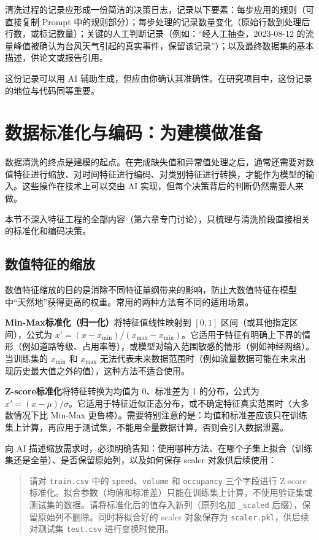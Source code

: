 清洗过程的记录应形成一份简洁的决策日志，记录以下要素：每步应用的规则（可直接复制 Prompt 中的规则部分）；每步处理的记录数量变化（原始行数到处理后行数，或标记数量）；关键的人工判断记录（例如：“经人工抽查，2023-08-12 的流量峰值被确认为台风天气引起的真实事件，保留该记录”）；以及最终数据集的基本描述，供论文或报告引用。

这份记录可以用 AI 辅助生成，但应由你确认其准确性。在研究项目中，这份记录的地位与代码同等重要。

\section{数据标准化与编码：为建模做准备}

数据清洗的终点是建模的起点。在完成缺失值和异常值处理之后，通常还需要对数值特征进行缩放、对时间特征进行编码、对类别特征进行转换，才能作为模型的输入。这些操作在技术上可以交由 AI 实现，但每个决策背后的判断仍然需要人来做。

本节不深入特征工程的全部内容（第六章专门讨论），只梳理与清洗阶段直接相关的标准化和编码决策。

\subsection{数值特征的缩放}

数值特征缩放的目的是消除不同特征量纲带来的影响，防止大数值特征在模型中“天然地”获得更高的权重。常用的两种方法有不同的适用场景。

\textbf{Min-Max标准化（归一化）}将特征值线性映射到 $[0, 1]$ 区间（或其他指定区间），公式为 $x' = (x - x_{\min}) / (x_{\max} - x_{\min})$。它适用于特征有明确上下界的情形（例如道路等级、占用率等），或模型对输入范围敏感的情形（例如神经网络）。当训练集的 $x_{\min}$ 和 $x_{\max}$ 无法代表未来数据范围时（例如流量数据可能在未来出现历史最大值之外的值），这种方法不适合使用。

\textbf{Z-score标准化}将特征转换为均值为 0、标准差为 1 的分布，公式为 $x' = (x - \mu) / \sigma$。它适用于特征近似正态分布，或不确定特征真实范围时（大多数情况下比 Min-Max 更鲁棒）。需要特别注意的是：均值和标准差应该只在训练集上计算，再应用于测试集，不能用全量数据计算，否则会引入数据泄露。

向 AI 描述缩放需求时，必须明确告知：使用哪种方法、在哪个子集上拟合（训练集还是全量）、是否保留原始列，以及如何保存 scaler 对象供后续使用：

\begin{quote}
请对 \texttt{train.csv} 中的 \texttt{speed}、\texttt{volume} 和 \texttt{occupancy} 三个字段进行 Z-score 标准化。拟合参数（均值和标准差）只能在训练集上计算，不使用验证集或测试集的数据。请将标准化后的值存入新列（原列名加 \texttt{\_scaled} 后缀），保留原始列不删除。同时将拟合好的 scaler 对象保存为 \texttt{scaler.pkl}，供后续对测试集 \texttt{test.csv} 进行变换时使用。
\end{quote}

